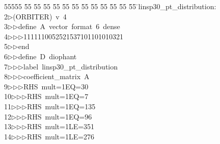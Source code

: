 %
%
\begin{tabbing}
55555 \= 55 \= 55 \= 55 \= 55 \= 55 \= 55 \= 55 \= 55 \= 55 \= 55 \= 55 \= 55 \= \>linsp30\_pt\_distribution:\\[0pt]
2\>$\triangleright$\>(ORBITER)\ v\ 4\ \\[0pt]
3\>$\triangleright$\>$\triangleright$\>define\ A\ vector\ format\ 6\ dense\ \\[0pt]
4\>$\triangleright$\>$\triangleright$\>$\triangleright$\>1111110052521537101101010321\ \\[0pt]
5\>$\triangleright$\>$\triangleright$\>end\ \\[0pt]
6\>$\triangleright$\>$\triangleright$\>define\ D\ diophant\ \\[0pt]
7\>$\triangleright$\>$\triangleright$\>$\triangleright$\>label\ linsp30\_pt\_distribution\ \\[0pt]
8\>$\triangleright$\>$\triangleright$\>$\triangleright$\>coefficient\_matrix\ A\ \\[0pt]
9\>$\triangleright$\>$\triangleright$\>$\triangleright$\>RHS\ mult=1EQ=30\ \\[0pt]
10\>$\triangleright$\>$\triangleright$\>$\triangleright$\>RHS\ mult=1EQ=7\ \\[0pt]
11\>$\triangleright$\>$\triangleright$\>$\triangleright$\>RHS\ mult=1EQ=135\ \\[0pt]
12\>$\triangleright$\>$\triangleright$\>$\triangleright$\>RHS\ mult=1EQ=96\ \\[0pt]
13\>$\triangleright$\>$\triangleright$\>$\triangleright$\>RHS\ mult=1LE=351\ \\[0pt]
14\>$\triangleright$\>$\triangleright$\>$\triangleright$\>RHS\ mult=1LE=276\ \\[0pt]

\end{tabbing}

